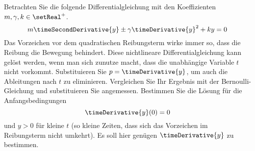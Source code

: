 \begin{atiTask}[
  title = Quadratisches Reibungsgesetz
]
  Betrachten Sie die folgende Differentialgleichung mit den Koeffizienten $m,\gamma, k\in\setReal^+$.
  \[
    m\timeSecondDerivative{y} \pm \gamma \timeDerivative{y}^2 + ky = 0
  \]
  Das Vorzeichen vor dem quadratischen Reibungsterm wirke immer so, dass die Reibung die Bewegung behindert.
  Diese nichtlineare Differentialgleichung kann gelöst werden, wenn man sich zunutze macht, dass die unabhängige Variable $t$ nicht vorkommt.
  Substituieren Sie $p=\timeDerivative{y}$, um auch die Ableitungen nach $t$ zu eliminieren.
  Vergleichen Sie Ihr Ergebnis mit der Bernoulli-Gleichung und substituieren Sie angemessen.
  Bestimmen Sie die Lösung für die Anfangsbedingungen
  \[
    \timeDerivative{y}(0) = 0
  \]
  und $y>0$ für kleine $t$ (so kleine Zeiten, dass sich das Vorzeichen im Reibungsterm nicht umkehrt).
  Es soll hier genügen $\timeDerivative{y}$ zu bestimmen.
\end{atiTask}